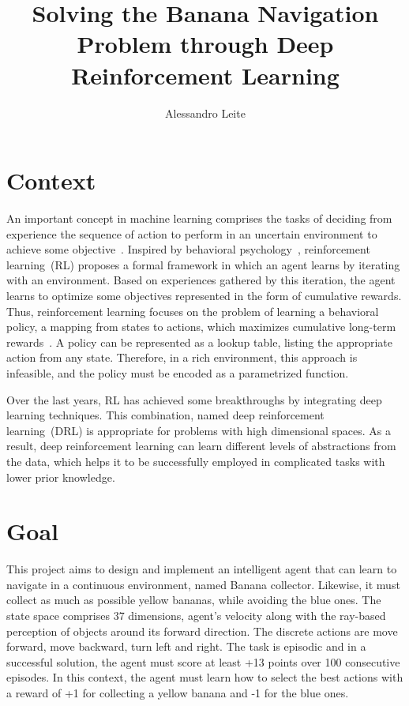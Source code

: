 \documentclass[12pt,english]{article}
\title{Solving the Banana Navigation Problem through Deep Reinforcement Learning}
\author{Alessandro Leite}
\date{}
\begin{document}
\maketitle
\thispagestyle{plain}
\vspace{-60pt}

\section{Context}\label{sec:introduction}

An important concept in machine learning comprises the tasks of deciding from experience the sequence of action to perform in an uncertain environment to achieve some objective~\cite{francois:18}. Inspired by behavioral psychology~\cite{sutton:18}, reinforcement learning~(RL) proposes a formal framework in which an agent learns by iterating with an environment. Based on experiences gathered by this iteration, the agent learns to optimize some objectives represented in the form of cumulative rewards. Thus, reinforcement learning focuses on the problem of learning a behavioral policy, a mapping from states to actions, which maximizes cumulative long-term rewards~\cite{sutton:18}. A policy can be represented as a lookup table, listing the appropriate action from any state. Therefore, in a rich environment, this approach is infeasible, and the policy must be encoded as a parametrized function.

Over the last years, RL has achieved some breakthroughs by integrating deep learning techniques. This combination, named deep reinforcement learning~(DRL) is appropriate for problems with high dimensional spaces. As a result, deep reinforcement learning can learn different levels of abstractions from the data, which helps it to be successfully employed in complicated tasks with lower prior knowledge.   

\section{Goal}

This project aims to design and implement an intelligent agent that can learn to navigate in a continuous environment, named Banana collector. Likewise, it must collect as much as possible yellow bananas, while avoiding the blue ones. The state space comprises 37 dimensions, agent's velocity along with the ray-based perception of objects around its forward direction. The discrete actions are move forward, move backward, turn left and right. The task is episodic and in a successful solution, the agent must score at least +13 points over 100 consecutive episodes. In this context, the agent must learn how to select the best actions with a reward of +1 for collecting a yellow banana and -1 for the blue ones. 
\end{document}
